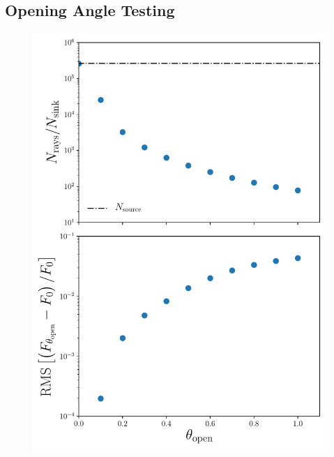 \documentclass[fleq,usenatbib]{mnras}
\begin{document}
\subsection{Opening Angle Testing}
\begin{figure}
\includegraphics[width=1\linewidth]{Figures/opening_angle.pdf}
\caption{}
\label{fig:openangle}
\end{figure}
\end{document}
